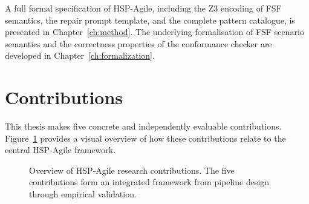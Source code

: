 A full formal specification of HSP-Agile, including the Z3 encoding of FSF semantics, the repair prompt template, and the complete pattern catalogue, is presented in Chapter~\ref{ch:method}.  The underlying formalisation of FSF scenario semantics and the correctness properties of the conformance checker are developed in Chapter~\ref{ch:formalization}.


\section{Contributions}
\label{sec:intro:contributions}

This thesis makes five concrete and independently evaluable contributions.  Figure~\ref{fig:contribution-map} provides a visual overview of how these contributions relate to the central HSP-Agile framework.

\begin{figure}[h]
  \centering
  \caption{Overview of HSP-Agile research contributions.  The five contributions form an integrated framework from pipeline design through empirical validation.}
  \label{fig:contribution-map}
\end{figure}

